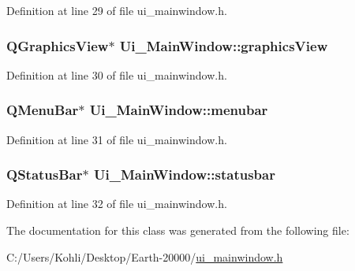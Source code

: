 Definition at line 29 of file ui\_\-mainwindow.h.\hypertarget{class_ui___main_window_a713d8e541d9de8389ad4292131dc931a}{
\subsubsection[{graphicsView}]{\setlength{\rightskip}{0pt plus 5cm}QGraphicsView$\ast$ {\bf Ui\_\-MainWindow::graphicsView}}}
\label{class_ui___main_window_a713d8e541d9de8389ad4292131dc931a}


Definition at line 30 of file ui\_\-mainwindow.h.\hypertarget{class_ui___main_window_adf43d9a67adaec750aaa956b5e082f09}{
\subsubsection[{menubar}]{\setlength{\rightskip}{0pt plus 5cm}QMenuBar$\ast$ {\bf Ui\_\-MainWindow::menubar}}}
\label{class_ui___main_window_adf43d9a67adaec750aaa956b5e082f09}


Definition at line 31 of file ui\_\-mainwindow.h.\hypertarget{class_ui___main_window_a1687cceb1e2787aa1f83e50433943a91}{
\subsubsection[{statusbar}]{\setlength{\rightskip}{0pt plus 5cm}QStatusBar$\ast$ {\bf Ui\_\-MainWindow::statusbar}}}
\label{class_ui___main_window_a1687cceb1e2787aa1f83e50433943a91}


Definition at line 32 of file ui\_\-mainwindow.h.

The documentation for this class was generated from the following file:\begin{DoxyCompactItemize}
\item 
C:/Users/Kohli/Desktop/Earth-\/20000/\hyperlink{ui__mainwindow_8h}{ui\_\-mainwindow.h}\end{DoxyCompactItemize}
